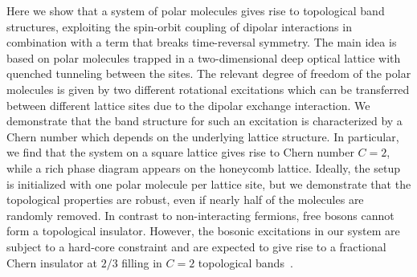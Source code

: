 


Here we show that a system of polar molecules gives rise to topological band structures, exploiting the spin-orbit coupling of dipolar interactions in combination with a term that breaks time-reversal symmetry.
The main idea is based on polar molecules trapped in a two-dimensional deep optical lattice with quenched tunneling between the sites.
The relevant degree of freedom of the polar molecules is given by two different rotational excitations which can be transferred between different lattice sites due to the dipolar exchange interaction.
We demonstrate that the band structure for such an excitation is characterized by a Chern number which depends on the underlying lattice structure.
In particular, we find that the system on a square lattice gives rise to Chern number $C=2$, while a rich phase diagram appears on the honeycomb lattice. %
Ideally, the setup is initialized with one polar molecule per lattice site, but we demonstrate that the topological properties are robust, even if nearly half of the molecules are randomly removed.
In contrast to non-interacting fermions, free bosons cannot form a topological insulator. However,
the bosonic excitations in our system are subject to a hard-core constraint and are expected to give rise to a fractional Chern insulator at $2/3$ filling in $C=2$ topological bands~\cite{Moller2009,Wang2012a,Sterdyniak2015}.

